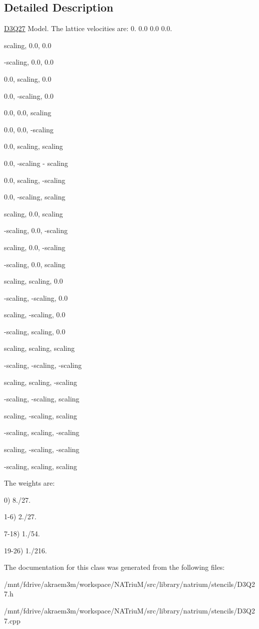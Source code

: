 \subsection{Detailed Description}
\hyperlink{classnatrium_1_1D3Q27}{D3Q27} Model. The lattice velocities are: 0. 0.0 0.0 0.0. 
\begin{DoxyEnumerate}
\item scaling, 0.0, 0.0
\item -\/scaling, 0.0, 0.0
\item 0.0, scaling, 0.0
\item 0.0, -\/scaling, 0.0
\item 0.0, 0.0, scaling
\item 0.0, 0.0, -\/scaling
\item 0.0, scaling, scaling
\item 0.0, -\/scaling -\/ scaling
\item 0.0, scaling, -\/scaling
\item 0.0, -\/scaling, scaling
\item scaling, 0.0, scaling
\item -\/scaling, 0.0, -\/scaling
\item scaling, 0.0, -\/scaling
\item -\/scaling, 0.0, scaling
\item scaling, scaling, 0.0
\item -\/scaling, -\/scaling, 0.0
\item scaling, -\/scaling, 0.0
\item -\/scaling, scaling, 0.0
\item scaling, scaling, scaling
\item -\/scaling, -\/scaling, -\/scaling
\item scaling, scaling, -\/scaling
\item -\/scaling, -\/scaling, scaling
\item scaling, -\/scaling, scaling
\item -\/scaling, scaling, -\/scaling
\item scaling, -\/scaling, -\/scaling
\item -\/scaling, scaling, scaling
\end{DoxyEnumerate}

The weights are:
\begin{DoxyItemize}
\item 0) 8./27.
\item 1-\/6) 2./27.
\item 7-\/18) 1./54.
\item 19-\/26) 1./216. 
\end{DoxyItemize}

The documentation for this class was generated from the following files:\begin{DoxyCompactItemize}
\item 
/mnt/fdrive/akraem3m/workspace/NATriuM/src/library/natrium/stencils/D3Q27.h\item 
/mnt/fdrive/akraem3m/workspace/NATriuM/src/library/natrium/stencils/D3Q27.cpp\end{DoxyCompactItemize}
